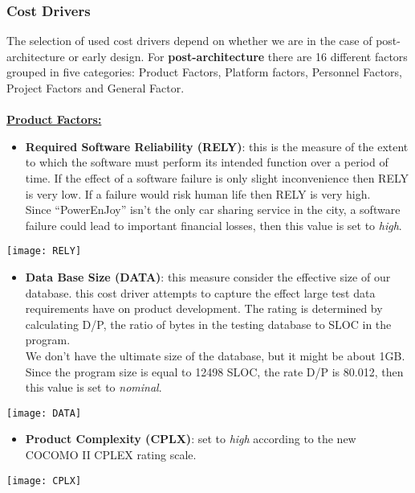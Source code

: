 \subsubsection{Cost Drivers}

The selection of used cost drivers depend on whether we are in the case of post-architecture or early design. For \textbf{post-architecture} there are 16 different factors grouped in five categories: Product Factors, Platform factors, Personnel Factors, Project Factors and General Factor.\\
\\
\textbf{\underline{Product Factors:}}

\begin{itemize}
	\item \textbf{Required Software Reliability (RELY)}: this is the measure of the extent to which the software must perform its intended function over a period of time. If the effect of a software failure is only slight inconvenience then RELY is very low. If a failure would risk human life then RELY is very high. \\ Since ``PowerEnJoy'' isn't the only car sharing service in the city, a software failure could lead to important financial losses, then this value is set to \textit{high}.
\end{itemize}
	\begin{center}
		\texttt{[image: RELY]}
	\end{center}

\begin{itemize}
	\item \textbf{Data Base Size (DATA)}: this measure consider the effective size of our database. this cost driver attempts to capture the effect large test data requirements have on product development. The rating is determined by calculating D/P, the ratio of bytes in the testing database to SLOC in the program. \\ We don't have the ultimate size of the database, but it might be about 1GB. Since the program size is equal to 12498 SLOC, the rate D/P is 80.012, then this value is set to \textit{nominal}. 
\end{itemize}
\begin{center}
	\texttt{[image: DATA]}
\end{center}

\begin{itemize}
	\item \textbf{Product Complexity (CPLX)}: set to \textit{high} according to the new COCOMO II CPLEX rating scale.
\end{itemize}
\begin{center}
	\texttt{[image: CPLX]}
\end{center}	

